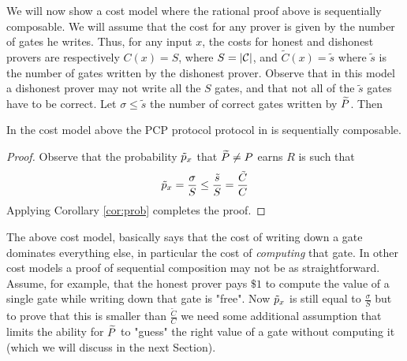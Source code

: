 We will now show  a cost model where the rational proof above is sequentially 
composable.
We will assume that the cost for any prover is given by the number of gates he 
writes. Thus, for any input 
$x$, the costs for honest and dishonest provers are 
respectively $C(x) = S$, where $S = |\cal C|$, and $\tilde{C}(x) = \tilde{s}$ 
where $\tilde s$ is the number of gates written by the dishonest prover.
Observe that in this model a dishonest prover may not write all the $S$ 
gates, and that not all of the $\tilde{s}$ gates have to be correct. Let $\sigma \leq \tilde{s}$ the number of correct gates written by $\widetilde{P}$. Then 

\begin{theorem}
In the cost model above the PCP protocol protocol in \cite{am1} is sequentially 
composable.
\end{theorem}
\begin{proof}
Observe that the probability $\tilde{p}_x$ that $\widetilde{P}\neq P$ earns $R$ is such that
$$ \tilde{p}_x = \frac{\sigma}{S} \leq \frac{\tilde s}{S} = \frac{\tilde C}{C} $$
Applying Corollary \ref{cor:prob} completes the proof.
\end{proof}

The above cost model, basically says that the cost of writing down a gate dominates everything else, in particular the cost of {\em computing} that gate. 
In other cost models a proof of sequential composition may not 
be as straightforward. Assume, for example, that the honest prover pays $\$1$ to
compute the value of a single gate while writing down that gate is "free". Now $\tilde{p}_x$ is still equal to $\frac{\sigma}{S}$ but to 
prove that this is smaller than $\frac{\tilde C}{C}$ we need some additional assumption that limits the ability for $\widetilde{P}$ to "guess" the 
right value of a gate without computing it (which we will discuss in the next Section). 


